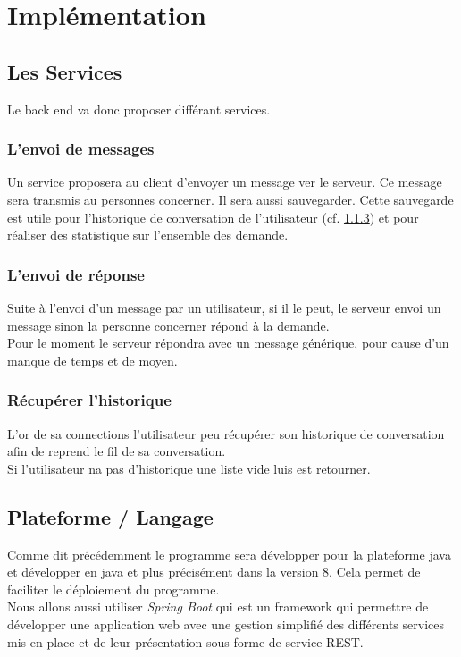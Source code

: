 \documentclass[12pt]{article}
\begin{document}
\section{Implémentation}

\subsection{Les Services}
Le back end va donc proposer différant services.

\subsubsection{L'envoi de messages}
Un service proposera au client d'envoyer un message ver le serveur.
Ce message sera	transmis au personnes concerner. Il sera aussi sauvegarder. Cette sauvegarde est utile pour l'historique de conversation de l'utilisateur (cf. \ref{recup_histo}) et pour réaliser des statistique sur l'ensemble des demande.


\subsubsection{L'envoi de réponse}
Suite à l'envoi d'un message par un utilisateur, si il le peut, le serveur envoi un message sinon la personne concerner répond à la demande.\\
Pour le moment le serveur répondra avec un message générique, pour cause d'un manque de temps et de moyen.


\subsubsection{Récupérer l'historique} \label{recup_histo}
L'or de sa connections l'utilisateur peu récupérer son historique de conversation afin de reprend le fil de sa conversation.
\\
Si l'utilisateur na pas d'historique une liste vide luis est retourner.


\subsection{Plateforme / Langage}
Comme dit précédemment le programme sera développer pour la plateforme java et développer en java et plus précisément dans la version 8. Cela permet de faciliter le déploiement du programme.
\\

Nous allons aussi utiliser \textit{Spring Boot} qui est un framework qui permettre de développer une application web avec une gestion simplifié des différents services mis en place et de leur présentation sous forme de service REST.
\end{document}
